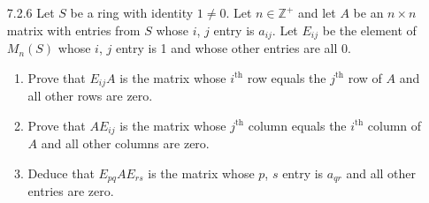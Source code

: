 \documentclass[9pt]{article}
\newcommand{\Z}{\mathbb{Z}}
\begin{document}
\begin{enumerate}
   \item[7.2.6]   Let $S$ be a ring with identity $1 \neq 0$. Let $n \in \Z^+$
                  and let $A$ be an $n \times n$ matrix with entries from $S$
                  whose $i$, $j$ entry is $a_{ij}$. Let $E_{ij}$ be the element
                  of $M_n(S)$ whose $i$, $j$ entry is 1 and whose other entries
                  are all 0.

                  \begin{enumerate}
                     \item Prove that $E_{ij}A$ is the matrix whose
                           $i^{\text{th}}$ row equals the $j^{\text{th}}$ row of
                           $A$ and all other rows are zero.
                     \item Prove that $AE_{ij}$ is the matrix whose
                           $j^{\text{th}}$ column equals the $i^{\text{th}}$
                           column of $A$ and all other columns are zero.
                     \item Deduce that $E_{pq}AE_{rs}$ is the matrix whose $p$,
                           $s$ entry is $a_{qr}$ and all other entries are zero.
                  \end{enumerate}


\end{enumerate}
\end{document}

